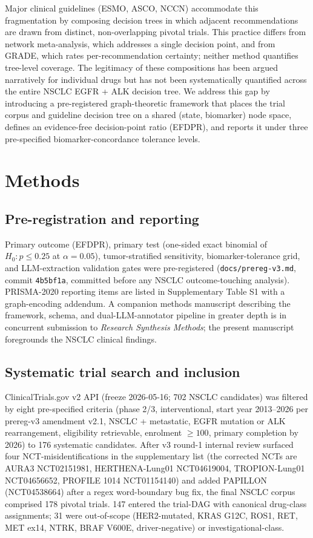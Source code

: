 \documentclass[11pt,a4paper]{article}
\begin{document}
Major clinical guidelines (ESMO, ASCO, NCCN) accommodate this fragmentation by composing decision trees in which adjacent recommendations are drawn from distinct, non-overlapping pivotal trials. This practice differs from network meta-analysis,\citep{rouse2017nma} which addresses a single decision point, and from GRADE,\citep{guyatt2008grade} which rates per-recommendation certainty; neither method quantifies tree-level coverage. The legitimacy of these compositions has been argued narratively for individual drugs but has not been systematically quantified across the entire NSCLC EGFR + ALK decision tree. We address this gap by introducing a pre-registered\citep{munafo2017manifesto} graph-theoretic framework that places the trial corpus and guideline decision tree on a shared (state, biomarker) node space, defines an evidence-free decision-point ratio (EFDPR), and reports it under three pre-specified biomarker-concordance tolerance levels.

\section{Methods}\label{sec:methods}

\subsection{Pre-registration and reporting}
Primary outcome (EFDPR), primary test (one-sided exact binomial of $H_0: p \le 0.25$ at $\alpha = 0.05$), tumor-stratified sensitivity, biomarker-tolerance grid, and LLM-extraction validation gates were pre-registered (\texttt{docs/prereg-v3.md}, commit \texttt{4b5bf1a}, committed before any NSCLC outcome-touching analysis). PRISMA-2020 reporting items\citep{moher2020prisma} are listed in Supplementary Table S1 with a graph-encoding addendum. A companion methods manuscript describing the framework, schema, and dual-LLM-annotator pipeline in greater depth is in concurrent submission to \textit{Research Synthesis Methods}; the present manuscript foregrounds the NSCLC clinical findings.

\subsection{Systematic trial search and inclusion}
ClinicalTrials.gov v2 API (freeze 2026-05-16; 702 NSCLC candidates) was filtered by eight pre-specified criteria (phase 2/3, interventional, start year 2013--2026 per prereg-v3 amendment v2.1, NSCLC + metastatic, EGFR mutation or ALK rearrangement, eligibility retrievable, enrolment $\ge 100$, primary completion by 2026) to 176 systematic candidates. After v3 round-1 internal review surfaced four NCT-misidentifications in the supplementary list (the corrected NCTs are AURA3 NCT02151981, HERTHENA-Lung01 NCT04619004, TROPION-Lung01 NCT04656652, PROFILE 1014 NCT01154140) and added PAPILLON (NCT04538664) after a regex word-boundary bug fix, the final NSCLC corpus comprised 178 pivotal trials. 147 entered the trial-DAG with canonical drug-class assignments; 31 were out-of-scope (HER2-mutated, KRAS G12C, ROS1, RET, MET ex14, NTRK, BRAF V600E, driver-negative) or investigational-class.
\end{document}
